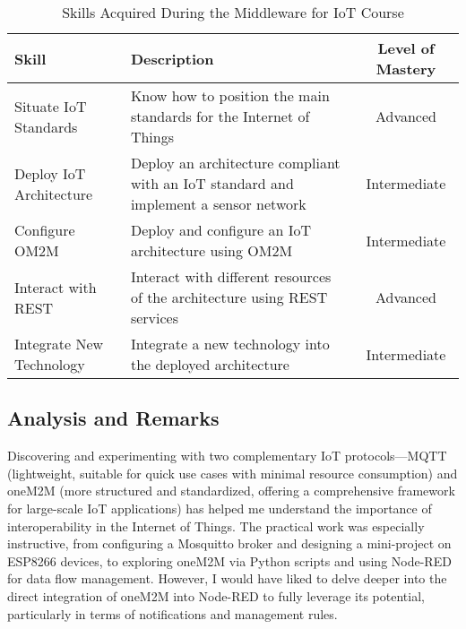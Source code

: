 \begin{table}[H]
    \centering
    \renewcommand{\arraystretch}{1.5} %
    \begin{tabular}{|>{\raggedright}p{3.5cm}|p{8cm}|c|}
    \hline
    \rowcolor[gray]{0.8}
    \textbf{Skill} & \textbf{Description} & \textbf{Level of Mastery} \\
    \hline
    Situate IoT Standards & Know how to position the main standards for the Internet of Things & Advanced \\
    \hline
    Deploy IoT Architecture & Deploy an architecture compliant with an IoT standard and implement a sensor network & Intermediate \\
    \hline
    Configure OM2M & Deploy and configure an IoT architecture using OM2M & Intermediate \\
    \hline
    Interact with REST & Interact with different resources of the architecture using REST services & Advanced \\
    \hline
    Integrate New Technology & Integrate a new technology into the deployed architecture & Intermediate \\
    \hline
    \end{tabular}
    \caption{Skills Acquired During the Middleware for IoT Course}
    \label{tab:skills_acquired}
\end{table}

\subsection{Analysis and Remarks}
\indent \indent Discovering and experimenting with two complementary IoT protocols—MQTT (lightweight, suitable for quick use cases with minimal resource consumption) and oneM2M (more structured and standardized, offering a comprehensive framework for large-scale IoT applications) has helped me understand the importance of interoperability in the Internet of Things. The practical work was especially instructive, from configuring a Mosquitto broker and designing a mini-project on ESP8266 devices, to exploring oneM2M via Python scripts and using Node-RED for data flow management.
However, I would have liked to delve deeper into the direct integration of oneM2M into Node-RED to fully leverage its potential, particularly in terms of notifications and management rules.
\vspace{0.25cm}

